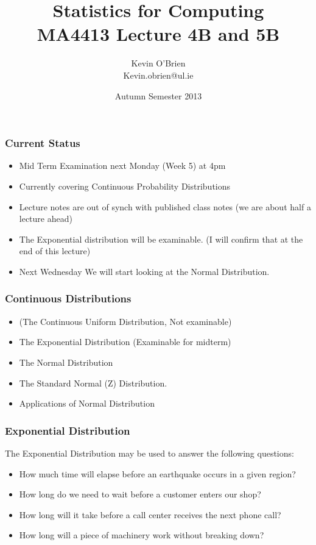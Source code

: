 \documentclass[a4]{beamer}
\title[MA4413]{Statistics for Computing \\ {\normalsize MA4413 Lecture 4B and 5B}}
\author[Kevin O'Brien]{Kevin O'Brien \\ {\scriptsize Kevin.obrien@ul.ie}}
\date{Autumn Semester 2013}
\institute[Maths \& Stats]{Dept. of Mathematics \& Statistics, \\ University \textit{of} Limerick}
\begin{document}
\begin{frame}
\titlepage
\end{frame}

\begin{frame}
\frametitle{Current Status}
\begin{itemize}
\item Mid Term Examination next Monday (Week 5) at 4pm
\item Currently covering Continuous Probability Distributions
\item Lecture notes are out of synch with published class notes (we are about half a lecture ahead)
\item The Exponential distribution will be examinable. (I will confirm that at the end of this lecture)
\item Next Wednesday We will start looking at the Normal Distribution.
\end{itemize}
\end{frame}

\begin{frame}[fragile]
\frametitle{Continuous Distributions}
\begin{itemize}
\item (The Continuous Uniform Distribution, Not examinable)
\item The Exponential Distribution (Examinable for midterm)
\item The Normal Distribution
\item The Standard Normal (Z) Distribution.
\item Applications of Normal Distribution
\end{itemize}
\end{frame}

\begin{frame}[fragile]
\frametitle{Exponential Distribution}
The Exponential Distribution may be used to answer the following questions:
\begin{itemize}
\item How much time will elapse before an earthquake occurs in a given region?
\item How long do we need to wait before a customer enters our shop?
\item How long will it take before a call center receives the next phone call?
\item How long will a piece of machinery work without breaking down?
\end{itemize}
\end{frame}
\end{document}
